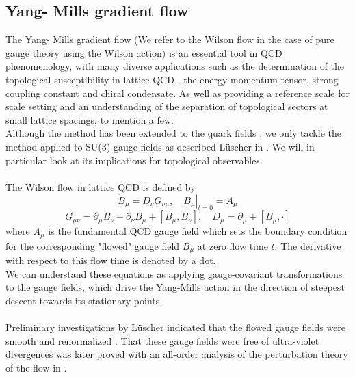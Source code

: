 \documentclass[a4paper,10pt]{article}
\begin{document}
\subsection{Yang- Mills gradient flow}
The Yang- Mills gradient flow (We refer to the Wilson flow in the case of pure gauge theory using the Wilson action) is an essential tool in QCD phenomenology, with many diverse applications such as the determination of the topological susceptibility in lattice QCD \cite{Luscher2010}, the energy-momentum tensor\cite{10.1093/ptep/ptt059}, strong coupling constant \cite{Luscher2010} and chiral condensate\cite{L_scher_2013}\cite{SHINDLER201471}. As well as providing a reference scale for scale setting and an understanding of the separation of topological sectors at small lattice spacings\cite{Luscher2010}, to mention a few.\\Although the method has been extended to the quark fields \cite{L_scher_2013}, we only tackle the method applied to SU(3) gauge fields as described Lüscher in \cite{Luscher2010}. We will in particular look at its implications for topological observables.\\\\The Wilson flow in lattice QCD is defined by
\begin{equation}\label{eq:flow1}
\dot{B}_{\mu}=D_{\nu} G_{\nu \mu},\left.\quad B_{\mu}\right|_{t=0}=A_{\mu}
\end{equation}
\begin{equation}\label{eq:flow2}
G_{\mu \nu}=\partial_{\mu} B_{\nu}-\partial_{\nu} B_{\mu}+\left[B_{\mu}, B_{\nu}\right], \quad D_{\mu}=\partial_{\mu}+\left[B_{\mu}, \cdot\right]
\end{equation}
where $A_\mu$ is the fundamental QCD gauge field which sets the boundary condition for the corresponding "flowed" gauge field $B_\mu$ at zero flow time $t$. The derivative with respect to this flow time is denoted by a dot.\\We can understand these equations as applying gauge-covariant transformations to the gauge fields, which drive the Yang-Mills action in the direction of steepest descent towards its stationary points.\\\\Preliminary investigations by Lüscher indicated that the flowed gauge fields were smooth and renormalized \cite{Luscher2010}. That these gauge fields were free of ultra-violet divergences was later proved with an all-order analysis of the perturbation theory of the flow in \cite{L_scher_2011}.
\end{document}
